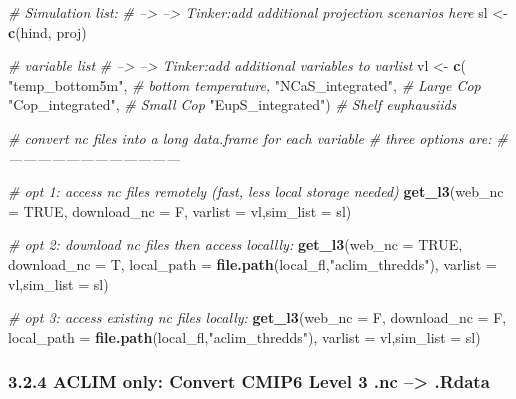 \documentclass[
]{article}
\newenvironment{Shaded}{\begin{snugshade}}{\end{snugshade}}
\newcommand{\CommentTok}[1]{\textcolor[rgb]{0.56,0.35,0.01}{\textit{#1}}}
\newcommand{\DataTypeTok}[1]{\textcolor[rgb]{0.13,0.29,0.53}{#1}}
\newcommand{\KeywordTok}[1]{\textcolor[rgb]{0.13,0.29,0.53}{\textbf{#1}}}
\newcommand{\NormalTok}[1]{#1}
\newcommand{\OtherTok}[1]{\textcolor[rgb]{0.56,0.35,0.01}{#1}}
\newcommand{\StringTok}[1]{\textcolor[rgb]{0.31,0.60,0.02}{#1}}
\begin{document}
\begin{Shaded}
\begin{Highlighting}[]
    \CommentTok{# Simulation list:}
    \CommentTok{# --> --> Tinker:add additional projection scenarios here}
\NormalTok{    sl <-}\StringTok{ }\KeywordTok{c}\NormalTok{(hind, proj)}
    
    \CommentTok{# variable list}
    \CommentTok{# --> --> Tinker:add additional variables to varlist}
\NormalTok{    vl <-}\StringTok{ }\KeywordTok{c}\NormalTok{(}
              \StringTok{"temp_bottom5m"}\NormalTok{,    }\CommentTok{# bottom temperature,}
              \StringTok{"NCaS_integrated"}\NormalTok{,  }\CommentTok{# Large Cop}
              \StringTok{"Cop_integrated"}\NormalTok{,   }\CommentTok{# Small Cop}
              \StringTok{"EupS_integrated"}\NormalTok{)  }\CommentTok{# Shelf  euphausiids}
    
    \CommentTok{# convert  nc files into a long data.frame for each variable}
    \CommentTok{# three options are:}
    \CommentTok{# ------------------------------------}
    
    \CommentTok{# opt 1: access nc files remotely (fast, less local storage needed)}
    \KeywordTok{get_l3}\NormalTok{(}\DataTypeTok{web_nc =} \OtherTok{TRUE}\NormalTok{, }\DataTypeTok{download_nc =}\NormalTok{ F,}
          \DataTypeTok{varlist =}\NormalTok{ vl,}\DataTypeTok{sim_list =}\NormalTok{ sl)}
    
    \CommentTok{# opt 2:  download nc files then access locallly:}
    \KeywordTok{get_l3}\NormalTok{(}\DataTypeTok{web_nc =} \OtherTok{TRUE}\NormalTok{, }\DataTypeTok{download_nc =}\NormalTok{ T,}
          \DataTypeTok{local_path =} \KeywordTok{file.path}\NormalTok{(local_fl,}\StringTok{"aclim_thredds"}\NormalTok{),}
          \DataTypeTok{varlist =}\NormalTok{ vl,}\DataTypeTok{sim_list =}\NormalTok{ sl)}
    
     \CommentTok{# opt 3:  access existing nc files locally:}
    \KeywordTok{get_l3}\NormalTok{(}\DataTypeTok{web_nc =}\NormalTok{ F, }\DataTypeTok{download_nc =}\NormalTok{ F,}
          \DataTypeTok{local_path =} \KeywordTok{file.path}\NormalTok{(local_fl,}\StringTok{"aclim_thredds"}\NormalTok{),}
          \DataTypeTok{varlist =}\NormalTok{ vl,}\DataTypeTok{sim_list =}\NormalTok{ sl)}
\end{Highlighting}
\end{Shaded}

\hypertarget{aclim-only-convert-cmip6-level-3-.nc-.rdata}{%
\subsubsection{3.2.4 ACLIM only: Convert CMIP6 Level 3 .nc
--\textgreater{}
.Rdata}\label{aclim-only-convert-cmip6-level-3-.nc-.rdata}}
\end{document}
